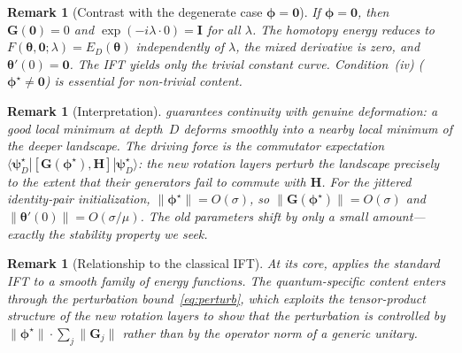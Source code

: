 \documentclass[11pt]{article}
\theoremstyle{plain}
\theoremstyle{plain}
\newtheorem{remark}[theorem]{Remark}
\begin{document}
\begin{remark}[Contrast with the degenerate case $\bm\phi=\bm 0$]
\label{rem:degenerate_phi_zero_app}
  If $\bm\phi=\bm 0$, then $\mathbf{G}(\bm 0)=0$ and $\exp(-i\lambda\cdot 0)=\mathbf{I}$
  for all $\lambda$.  The homotopy energy reduces to
  $F(\bm\theta,\bm 0;\lambda)=E_D(\bm\theta)$ independently of
  $\lambda$, the mixed derivative is zero, and $\bm\theta'(0)=\bm 0$.
  The IFT yields only the trivial constant curve.  Condition~(iv)
  ($\bm\phi^\star\neq\bm 0$) is essential for non-trivial content.
\end{remark}
\begin{remark}[Interpretation]
\label{rem:continuation_interp}
   guarantees \emph{continuity with genuine
  deformation}: a good local minimum at depth~$D$ deforms smoothly
  into a nearby local minimum of the deeper landscape.  The driving
  force is the commutator expectation
  $\langle\boldsymbol{\psi}_D^\star|[\mathbf{G}(\bm\phi^\star),\mathbf{H}]|\boldsymbol{\psi}_D^\star\rangle$:
  the new rotation layers perturb the landscape precisely to the
  extent that their generators fail to commute with $\mathbf{H}$.
  For the jittered identity-pair initialization,
  $\|\bm\phi^\star\|=O(\sigma)$, so $\|\mathbf{G}(\bm\phi^\star)\|=O(\sigma)$
  and $\|\bm\theta'(0)\|=O(\sigma/\mu)$.  The old parameters shift by
  only a small amount---exactly the stability property we seek.
\end{remark}
\begin{remark}[Relationship to the classical IFT]
\label{rem:ift_scope_app}
  At its core,  applies the standard IFT to a
  smooth family of energy functions.  The quantum-specific content
  enters through the perturbation bound~\eqref{eq:perturb}, which
  exploits the tensor-product structure of the new rotation layers to
  show that the perturbation is controlled by
  $\|\bm\phi^\star\|\cdot\sum_j\|\mathbf{G}_j\|$ rather than by the operator
  norm of a generic unitary.
\end{remark}
\end{document}
